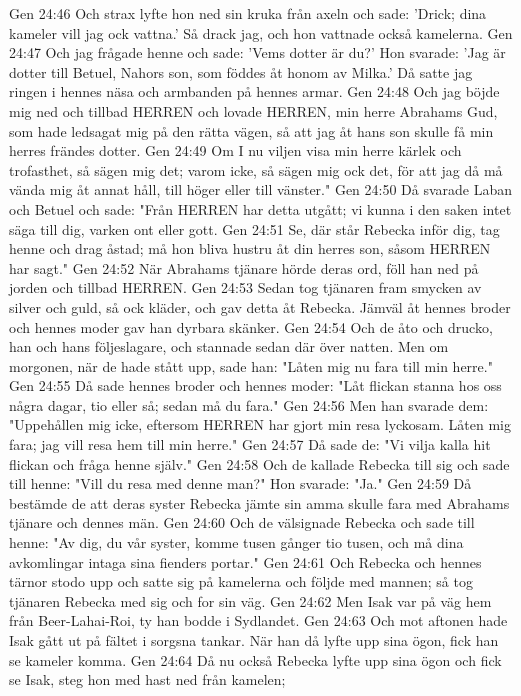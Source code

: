 Gen 24:46  Och strax lyfte hon ned sin kruka från axeln och sade: 'Drick; dina kameler vill jag ock vattna.' Så drack jag, och hon vattnade också kamelerna.
Gen 24:47  Och jag frågade henne och sade: 'Vems dotter är du?' Hon svarade: 'Jag är dotter till Betuel, Nahors son, som föddes åt honom av Milka.' Då satte jag ringen i hennes näsa och armbanden på hennes armar.
Gen 24:48  Och jag böjde mig ned och tillbad HERREN och lovade HERREN, min herre Abrahams Gud, som hade ledsagat mig på den rätta vägen, så att jag åt hans son skulle få min herres frändes dotter.
Gen 24:49  Om I nu viljen visa min herre kärlek och trofasthet, så sägen mig det; varom icke, så sägen mig ock det, för att jag då må vända mig åt annat håll, till höger eller till vänster."
Gen 24:50  Då svarade Laban och Betuel och sade: "Från HERREN har detta utgått; vi kunna i den saken intet säga till dig, varken ont eller gott.
Gen 24:51  Se, där står Rebecka inför dig, tag henne och drag åstad; må hon bliva hustru åt din herres son, såsom HERREN har sagt."
Gen 24:52  När Abrahams tjänare hörde deras ord, föll han ned på jorden och tillbad HERREN.
Gen 24:53  Sedan tog tjänaren fram smycken av silver och guld, så ock kläder, och gav detta åt Rebecka. Jämväl åt hennes broder och hennes moder gav han dyrbara skänker.
Gen 24:54  Och de åto och drucko, han och hans följeslagare, och stannade sedan där över natten. Men om morgonen, när de hade stått upp, sade han: "Låten mig nu fara till min herre."
Gen 24:55  Då sade hennes broder och hennes moder: "Låt flickan stanna hos oss några dagar, tio eller så; sedan må du fara."
Gen 24:56  Men han svarade dem: "Uppehållen mig icke, eftersom HERREN har gjort min resa lyckosam. Låten mig fara; jag vill resa hem till min herre."
Gen 24:57  Då sade de: "Vi vilja kalla hit flickan och fråga henne själv."
Gen 24:58  Och de kallade Rebecka till sig och sade till henne: "Vill du resa med denne man?" Hon svarade: "Ja."
Gen 24:59  Då bestämde de att deras syster Rebecka jämte sin amma skulle fara med Abrahams tjänare och dennes män.
Gen 24:60  Och de välsignade Rebecka och sade till henne: "Av dig, du vår syster, komme tusen gånger tio tusen, och må dina avkomlingar intaga sina fienders portar."
Gen 24:61  Och Rebecka och hennes tärnor stodo upp och satte sig på kamelerna och följde med mannen; så tog tjänaren Rebecka med sig och for sin väg.
Gen 24:62  Men Isak var på väg hem från Beer-Lahai-Roi, ty han bodde i Sydlandet.
Gen 24:63  Och mot aftonen hade Isak gått ut på fältet i sorgsna tankar. När han då lyfte upp sina ögon, fick han se kameler komma.
Gen 24:64  Då nu också Rebecka lyfte upp sina ögon och fick se Isak, steg hon med hast ned från kamelen;
